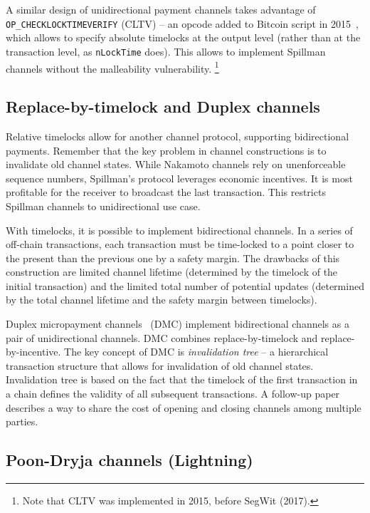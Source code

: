 A similar design of unidirectional payment channels takes advantage of \texttt{OP\_CHECKLOCKTIMEVERIFY} (CLTV) -- an opcode added to Bitcoin script in 2015~\cite{Todd2014}, which allows to specify absolute timelocks at the output level (rather than at the transaction level, as \texttt{nLockTime} does).
This allows to implement Spillman channels without the malleability vulnerability.
\footnote{Note that CLTV was implemented in 2015, before SegWit (2017).}


\subsection{Replace-by-timelock and Duplex channels}

Relative timelocks allow for another channel protocol, supporting bidirectional payments.
Remember that the key problem in channel constructions is to invalidate old channel states.
While Nakamoto channels rely on unenforceable sequence numbers, Spillman's protocol leverages economic incentives.
It is most profitable for the receiver to broadcast the last transaction.
This restricts Spillman channels to unidirectional use case.

With timelocks, it is possible to implement bidirectional channels.
In a series of off-chain transactions, each transaction must be time-locked to a point closer to the present than the previous one by a safety margin.
The drawbacks of this construction are limited channel lifetime (determined by the timelock of the initial transaction) and the limited total number of potential updates (determined by the total channel lifetime and the safety margin between timelocks).

Duplex micropayment channels~\cite{Decker2015} (DMC) implement bidirectional channels as a pair of unidirectional channels.
DMC combines replace-by-timelock and replace-by-incentive.
The key concept of DMC is \textit{invalidation tree} -- a hierarchical transaction structure that allows for invalidation of old channel states.
Invalidation tree is based on the fact that the timelock of the first transaction in a chain defines the validity of all subsequent transactions.
A follow-up paper~\cite{Burchert2017} describes a way to share the cost of opening and closing channels among multiple parties.


\subsection{Poon-Dryja channels (Lightning)}

